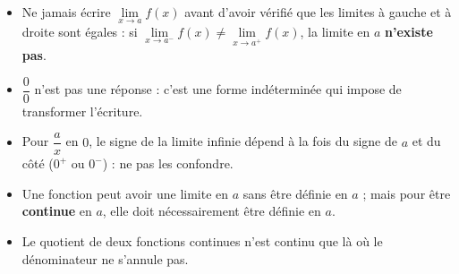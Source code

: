 \documentclass[11pt]{article}
\begin{document}
\begin{attention}
\begin{itemize}
  \item Ne jamais \'ecrire $\lim\limits_{x\to a}f(x)$ avant d'avoir v\'erifi\'e que les limites \`a gauche et \`a droite sont \'egales : si $\lim\limits_{x\to a^-}f(x)\neq\lim\limits_{x\to a^+}f(x)$, la limite en $a$ \textbf{n'existe pas}.
  \item $\dfrac{0}{0}$ n'est pas une r\'eponse : c'est une forme ind\'etermin\'ee qui impose de transformer l'\'ecriture.
  \item Pour $\dfrac{a}{x}$ en $0$, le signe de la limite infinie d\'epend \`a la fois du signe de $a$ et du c\^ot\'e ($0^+$ ou $0^-$) : ne pas les confondre.
  \item Une fonction peut avoir une limite en $a$ sans \^etre d\'efinie en $a$ ; mais pour \^etre \textbf{continue} en $a$, elle doit n\'ecessairement \^etre d\'efinie en $a$.
  \item Le quotient de deux fonctions continues n'est continu que l\`a o\`u le d\'enominateur ne s'annule pas.
\end{itemize}
\end{attention}
\end{document}
